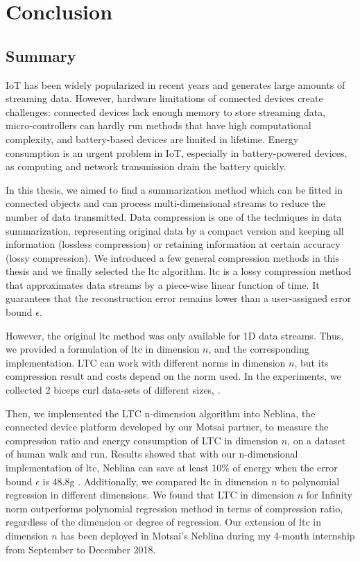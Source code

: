 \chapter{Conclusion}


\section{Summary}


IoT has been widely popularized in recent years and generates large amounts of
streaming data. However, hardware limitations of connected devices create challenges:
connected devices lack enough memory to store streaming data,
micro-controllers can hardly run methods that have high computational
complexity, and battery-based devices are limited in lifetime. Energy consumption is an urgent problem in
IoT, especially in battery-powered devices, as computing and network
transmission drain the battery quickly.

In this thesis, we aimed to find a summarization method which can be fitted
in connected objects and can process multi-dimensional streams to reduce
the number of data transmitted. Data compression is one of the techniques
in data summarization, representing original data by a compact version and
keeping all information (lossless compression) or retaining information at
certain accuracy (lossy compression). We introduced a few general
compression methods in this thesis and we finally selected the
\acrfull{ltc} algorithm. \acrshort{ltc} is a lossy compression method that
approximates data streams by a piece-wise linear function of time. It
guarantees that the reconstruction error remains lower than a user-assigned
error bound $\epsilon$. 

However, the original \acrshort{ltc} method was only available for 1D data
streams. Thus, we provided a formulation of \acrshort{ltc} in dimension
$n$, and the corresponding implementation. LTC can work with different
norms in dimension $n$, but its compression result and costs depend on the
norm used. In the experiments, we collected 2 biceps curl data-sets of
different sizes,  .

Then, we implemented the LTC n-dimension algorithm into Neblina, the
connected device platform developed by our Motsai partner, to measure the
compression ratio and energy consumption of LTC in dimension $n$, on a
dataset of human walk and run. Results showed that with our n-dimensional
implementation of \acrshort{ltc}, Neblina can save at least 10\% of energy
when the error bound $\epsilon$ is 48.8g . Additionally, we compared
\acrshort{ltc} in dimension $n$ to polynomial regression in different
dimensions. We found that LTC in dimension $n$ for Infinity norm  outperforms polynomial regression method in terms of
compression ratio, regardless of the dimension or degree of regression. Our
extension of \acrshort{ltc} in dimension $n$ has been deployed in Motsai's
Neblina during my 4-month internship from September to December 2018.

